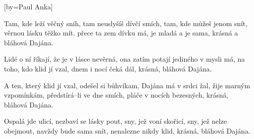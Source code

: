 [by={Paul Anka}]

\beginverse{}
Tam, kde leží věčný sníh, tam neuslyšíš dívčí smích,
tam, kde můžeš jenom snít, věrnou lásku těžko mít.
přece ta zem dívku má, je mladá a je sama,
krásná a bláhová Dajána.   
\endverse{}

\beginverse{}
\chordsoff{}
Lidé o ní říkají, že je v lásce nevěrná,
ona zatím potají jediného v mysli má,
na toho, kdo klid jí vzal, dnem i nocí čeká dál,
krásná, bláhová Dajána.   
\chordson{}
\endverse{}

\beginverse{}
\chordsoff{}
A ten, který klid jí vzal, odešel si bůhvíkam,
Dajána má v srdci žal, žije marným vzpomínkám,
předstírá--li ve dne smích, pláče v nocích bezesných,
krásná, bláhová Dajána.   
\chordson{}
\endverse{}

\beginverse{}
\chordsoff{}
Ospalá jde ulicí, nezbaví se lásky pout,
sny, jež voní skořicí, sny, jež nelze obejmout,
navždy bude sama snít, nenalezne nikdy klid,
krásná, bláhová Dajána.   
\chordson{}
\endverse{}

\endsong{}

